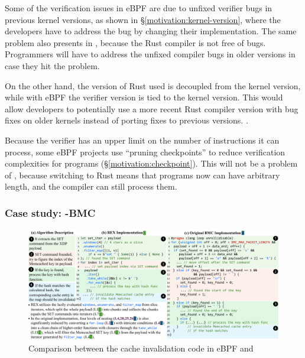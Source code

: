 
Some of the verification issues in eBPF are due to unfixed verifier bugs in
    previous kernel versions, as shown in \S\ref{motivation:kernel-version},
    where the developers have to address the bug by changing their
    implementation.
The same problem also presents in \projname{}, because the Rust compiler is not
    free of bugs.
Programmers will have to address the unfixed compiler bugs in older versions
    in case they hit the problem.

On the other hand, the version of Rust used is decoupled from the kernel version, while
    with eBPF the verifier version is tied to the kernel version.
This would allow developers to potentially use a more recent Rust compiler version with
    bug fixes on older kernels instead of porting fixes to previous versions.
.

Because the verifier has an upper limit on the number of instructions it can
    process, some eBPF projects use ``pruning checkpoints'' to reduce
    verification complexities for programs (\S\ref{motivation:checkpoint}).
This will not be a problem of \projname{}, because switching to Rust means that
    programs now can have arbitrary length, and the compiler can still process
    them.

\subsubsection{Case study: \projname{}-BMC}
\label{eval:bmc-case-study}

\begin{figure}[t]
    \includegraphics[width=1.0\linewidth]{figs/rusty-bmc.pdf}
    \centering
    \vspace{-10pt}
    \caption{Comparison between the cache invalidation code in eBPF
        and \projname{}}
    \vspace{-10pt}
    \label{fig:rust-code}
\end{figure}

